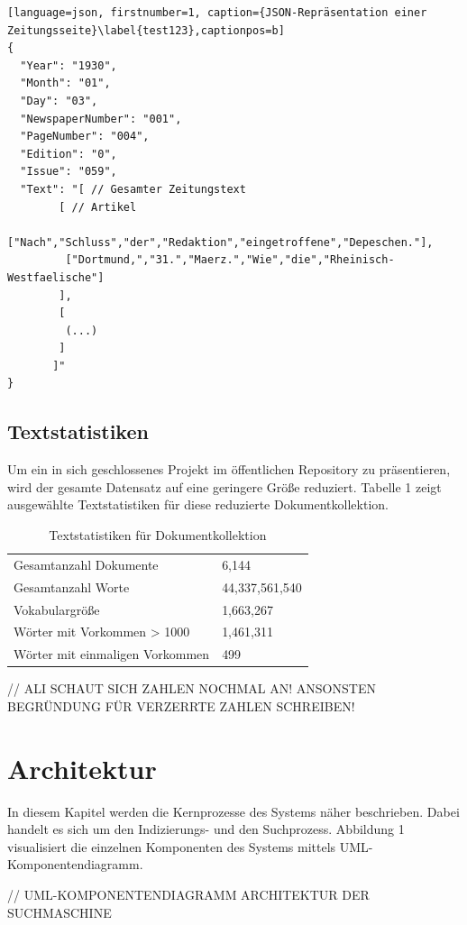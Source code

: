 \documentclass[11pt,a4paper, halfparskip]{scrartcl}
\begin{document}
\break

\begin{lstlisting}[language=json, firstnumber=1, caption={JSON-Repräsentation einer Zeitungsseite}\label{test123},captionpos=b]
{
  "Year": "1930",
  "Month": "01",
  "Day": "03",
  "NewspaperNumber": "001",
  "PageNumber": "004",
  "Edition": "0",
  "Issue": "059",
  "Text": "[ // Gesamter Zeitungstext
	    [ // Artikel
	     ["Nach","Schluss","der","Redaktion","eingetroffene","Depeschen."], 
	     ["Dortmund,","31.","Maerz.","Wie","die","Rheinisch-Westfaelische"] 
	    ], 
	    [
	     (...)
	    ] 
	   ]"
}
\end{lstlisting}

\subsection{Textstatistiken}
Um ein in sich geschlossenes Projekt im öffentlichen Repository zu präsentieren, wird der gesamte Datensatz auf eine geringere Größe reduziert.
Tabelle 1 zeigt ausgewählte Textstatistiken für diese reduzierte Dokumentkollektion.

\begin{table}[h!]
	\centering
	\begin{tabularx}{0.8\textwidth}{lX}
		\hline
		Gesamtanzahl Dokumente & 6,144\\
		Gesamtanzahl Worte & 44,337,561,540 \\
		Vokabulargröße & 1,663,267 \\
		Wörter mit Vorkommen > 1000 & 1,461,311 \\
		Wörter mit einmaligen Vorkommen & 499 \\
		\hline
	\end{tabularx}
	\caption{Textstatistiken für Dokumentkollektion}
\end{table}

// ALI SCHAUT SICH ZAHLEN NOCHMAL AN! ANSONSTEN BEGRÜNDUNG FÜR VERZERRTE ZAHLEN SCHREIBEN!

\section{Architektur}

In diesem Kapitel werden die Kernprozesse des Systems näher beschrieben. 
Dabei handelt es sich um den Indizierungs- und den Suchprozess.
Abbildung 1 visualisiert die einzelnen Komponenten des Systems mittels UML-Komponentendiagramm. 

// UML-KOMPONENTENDIAGRAMM ARCHITEKTUR DER SUCHMASCHINE 
\end{document}
